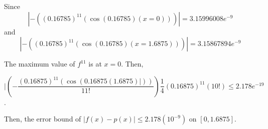 \documentclass[12pt]{article}
\begin{document}
\begin{enumerate}[leftmargin=2em]
    Since
    \[|-((0.16785)^{11}(\cos(0.16785)(x=0)))| = 3.15996008e^{-9}\]
    and 
    \[|-((0.16785)^{11}(\cos(0.16785)(x=1.6875)))| = 3.15867894e^{-9}\]

    The maximum value of $f^{11}$ is at $x=0$. Then,
    
    \[|(-\frac{(0.16875)^{11}(\cos(0.16875(1.6875)|))}{11!})\frac{1}{4}(0.16875)^{11}(10!) \leq 2.178e^{-19} \].

    Then, the error bound of $|f(x)-p(x)| \leq 2.178(10^{-9})$ on $[0, 1.6875]$.
    
\end{enumerate}
\end{document}
